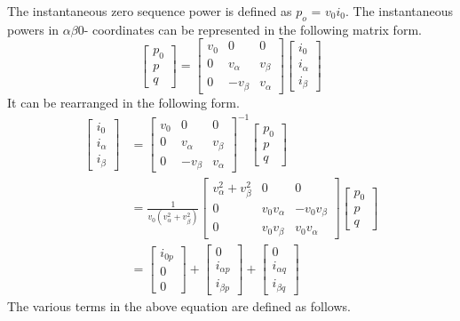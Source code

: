 The instantaneous zero sequence power is defined as $p_o$ = $v_0$$i_0$.
The instantaneous powers in $\alpha\beta 0$- coordinates can be represented in the following matrix form.
\begin{equation}
\begin{bmatrix} p_0 \\p \\ q
\end{bmatrix}= \begin{bmatrix} v_0 &  0 & 0 \\ 0 & v_\alpha & v_\beta \\ 0 & -v_\beta  & v_\alpha
\end{bmatrix} \begin{bmatrix} i_0 \\i_\alpha  \\
i_\beta
\end{bmatrix}
\label{eqn2.7}
\end{equation}
It can be rearranged in the following form.
\begin{equation}
\begin{aligned}
\begin{bmatrix} i_0 \\i_\alpha  \\
i_\beta
\end{bmatrix} &= {\begin{bmatrix} v_0 &  0 & 0 \\ 0 & v_\alpha & v_\beta \\ 0 & -v_\beta  & v_\alpha
\end{bmatrix}}^{-1} \begin{bmatrix} p_0 \\p \\ q
\end{bmatrix} \\ &= \frac{1}{v_0 ({v_\alpha^2 + v_\beta^2})}  \begin{bmatrix} {v_\alpha^2 + v_\beta^2} & 0 & 0 \\ 0 & v_0 v_\alpha & -v_0 v_\beta \\ 0 & v_0 v_\beta & v_0 v_\alpha
\end{bmatrix} \begin{bmatrix} p_0 \\p \\ q
\end{bmatrix} \\ &= \begin{bmatrix} i_{0 p} \\ 0 \\ 0
\end{bmatrix} + \begin{bmatrix} 0 \\ i_{\alpha p} \\ i_{\beta p}
\end{bmatrix} +\begin{bmatrix} 0 \\ i_{\alpha q} \\ i_{\beta q} 
\end{bmatrix}
\label{eqn2.8}
\end{aligned}
\end{equation}
The various terms in the above equation are defined as follows.

